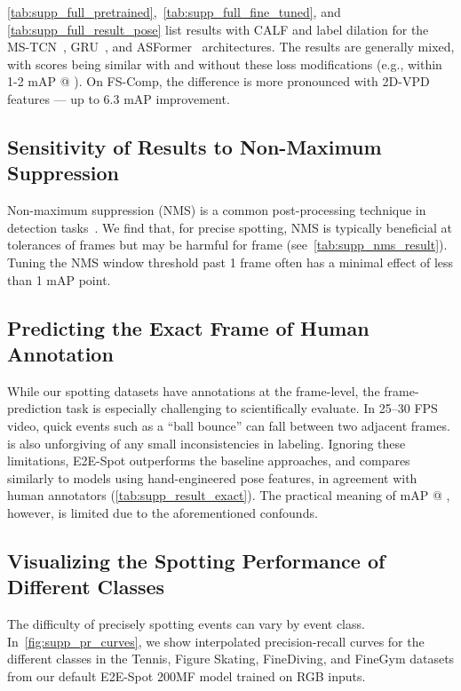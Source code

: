 \documentclass[runningheads]{llncs}
\newcommand{\OURMETHOD}{{E2E-Spot}\xspace}
\newcommand{\fscomp}{{FS-Comp}\xspace}
\newcommand{\finegym}{{FineGym}\xspace}
\newcommand{\finediving}{{FineDiving}\xspace}
\begin{document}
\autoref{tab:supp_full_pretrained},~\ref{tab:supp_full_fine_tuned}, and \ref{tab:supp_full_result_pose} list results with CALF and label dilation for the MS-TCN~\cite{mstcn}, GRU~\cite{gatedrnn}, and ASFormer~\cite{asformer} architectures.
The results are generally mixed, with scores being similar with and without these loss modifications (e.g., within 1-2 mAP @ ).
On \fscomp, the difference is more pronounced with 2D-VPD~\cite{vpd} features --- up to 6.3 mAP improvement.

\subsection{Sensitivity of Results to Non-Maximum Suppression}
\label{sub:supp_ablate_nms}

Non-maximum suppression (NMS) is a common post-processing technique in detection tasks~\cite{soccernetv2,rcnn}.
We find that, for precise spotting, NMS is typically beneficial at tolerances of  frames but may be harmful for  frame (see~\autoref{tab:supp_nms_result}).
Tuning the NMS window threshold past 1 frame often has a minimal effect of less than 1 mAP point.

\subsection{Predicting the Exact Frame of Human Annotation}
\label{sub:supp_result_exact}

While our spotting datasets have annotations at the frame-level, the  frame-prediction task is especially challenging to scientifically evaluate.
In 25--30 FPS video, quick events such as a ``ball bounce'' can fall between two adjacent frames.
 is also unforgiving of any small inconsistencies in labeling.
Ignoring these limitations, \OURMETHOD outperforms the baseline approaches, and compares similarly to models using hand-engineered pose features, in agreement with human annotators (\autoref{tab:supp_result_exact}).
The practical meaning of mAP @ , however, is limited due to the aforementioned confounds.

\subsection{Visualizing the Spotting Performance of Different Classes}
\label{sub:supp_breakdown_class}

The difficulty of precisely spotting events can vary by event class.
In~\autoref{fig:supp_pr_curves}, we show interpolated precision-recall curves for the different classes in the Tennis, Figure Skating, \finediving, and \finegym datasets from our default \OURMETHOD 200MF model trained on RGB inputs.
\end{document}
